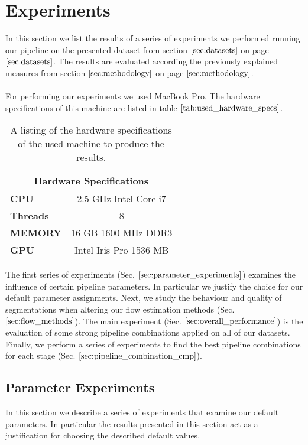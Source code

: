 \section{Experiments}
\label{sec:experiments}
In this section we list the results of a series of experiments we performed running our pipeline on the presented dataset from section $\ref{sec:datasets}$ on page $\pageref{sec:datasets}$. The results are evaluated according the previously explained measures from section $\ref{sec:methodology}$ on page $\pageref{sec:methodology}$. \\ \\
For performing our experiments we used MacBook Pro. The hardware specifications of this machine are listed in table $\ref{tab:used_hardware_specs}$. 
\begin{table}[H]
\centering
\begin{tabular}{|l|c|}
\hline
\multicolumn{2}{|c|}{\textbf{Hardware Specifications}} \\ \hline
\textbf{CPU} & 2.5 GHz Intel Core i7 \\ \hline
\textbf{Threads} & 8 \\ \hline
\textbf{MEMORY} & 16 GB 1600 MHz DDR3 \\ \hline
\textbf{GPU} & Intel Iris Pro 1536 MB \\ \hline
\end{tabular}
\caption{A listing of the hardware specifications of the used machine to produce the results.}
\label{tab:used_hardware_specs}
\end{table}
The first series of experiments (Sec. $\ref{sec:parameter_experiments}$) examines the influence of certain pipeline parameters. In particular we justify the choice for our default parameter assignments. Next, we study the behaviour and quality of segmentations when altering our flow estimation methods (Sec. $\ref{sec:flow_methods}$). The main experiment (Sec. $\ref{sec:overall_performance}$) is the evaluation of some strong pipeline combinations applied on all of our datasets. Finally, we perform a series of experiments to find the best pipeline combinations for each stage (Sec. $\ref{sec:pipeline_combination_cmp}$).

\subsection{Parameter Experiments}
\label{sec:parameter_experiments}
In this section we describe a series of experiments that examine our default parameters. In particular the results presented in this section act as a justification for choosing the described default values.

